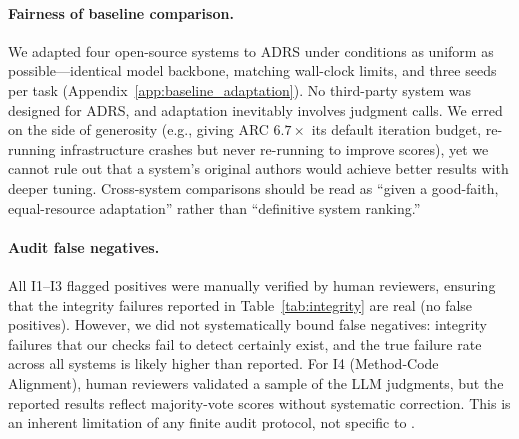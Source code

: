 
\paragraph{Fairness of baseline comparison.}
We adapted four open-source systems to ADRS under conditions as uniform as possible---identical model backbone, matching wall-clock limits, and three seeds per task (Appendix~\ref{app:baseline_adaptation}).
No third-party system was designed for ADRS, and adaptation inevitably involves judgment calls.
We erred on the side of generosity (e.g., giving ARC $6.7\times$ its default iteration budget, re-running infrastructure crashes but never re-running to improve scores), yet we cannot rule out that a system's original authors would achieve better results with deeper tuning.
Cross-system comparisons should be read as ``given a good-faith, equal-resource adaptation'' rather than ``definitive system ranking.''

\paragraph{Audit false negatives.}
All I1--I3 flagged positives were manually verified by human reviewers, ensuring that the integrity failures reported in Table~\ref{tab:integrity} are real (no false positives).
However, we did not systematically bound false negatives: integrity failures that our checks fail to detect certainly exist, and the true failure rate across all systems is likely higher than reported.
For I4 (Method-Code Alignment), human reviewers validated a sample of the LLM judgments, but the reported results reflect majority-vote scores without systematic correction.
This is an inherent limitation of any finite audit protocol, not specific to \coeaudit{}.

